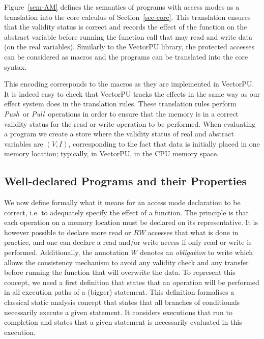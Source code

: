 \documentclass[preprint,12pt]{elsarticle}
\newcommand{\symb}[1]{\textit{#1}}
\newcommand{\Push}{\symb{Push}}
\newcommand{\Pull}{\symb{Pull}}
\begin{document}
Figure~\ref{sem-AM} defines the semantics of programs with access modes as a translation 
into the core calculus of Section~\ref{sec-core}. 
This translation
ensures that the validity status is correct and records the effect of the function on the 
abstract variable before running the function call that may 
read and write data (on the real variables).  Similarly to the VectorPU library, the 
protected accesses can be 
considered as macros and the programs can be translated into the 
core syntax.

This encoding corresponds  to the macros as they are implemented in VectorPU.  
It is indeed easy 
to check that VectorPU tracks the effects in 
the same way as our effect system  does in the translation rules. These translation 
rules  perform \Push\ or 
\Pull\ operations in order to ensure that the memory is in a correct validity status for 
the read or write operation to be performed.
When evaluating a program we create a store where the validity status of real and 
abstract variables are $(V,I)$, corresponding to the fact that data is 
initially placed in one memory location; typically, in VectorPU, in the CPU memory space.
%
%


\subsection{Well-declared Programs and their Properties}
We now define formally what it means for an access mode declaration to be correct, i.e. 
to adequately specify the effect of a function. The principle is that each operation on a 
memory location must be declared on its representative. It is however possible to declare 
more read or $RW$ accesses that what is done in practice, and one can declare a read 
and/or write 
access if only read or write is performed. Additionally, the annotation $W$ denotes an 
\emph{obligation} to write which allows the consistency mechanism to avoid any validity 
check and any transfer before running the function that will overwrite the data. 
To represent this concept, we need a first definition that states that an operation will be performed in all execution paths of a (bigger) statement. This 
definition 
formalises a classical static analysis concept that states that all branches of 
conditionals necessarily execute a given statement. It considers executions that run to 
completion and states that a given statement is necessarily evaluated in this execution.
\end{document}
